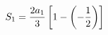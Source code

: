 \documentclass[preview]{standalone}
\begin{document}
\begin{align*}
\special{dvisvgm:raw <g id='unique000'>}S_1=\frac{2a_1}{3}\left[1-\left(-\frac{1}{2}\right)\right]\special{dvisvgm:raw </g>}
\end{align*}
\end{document}
